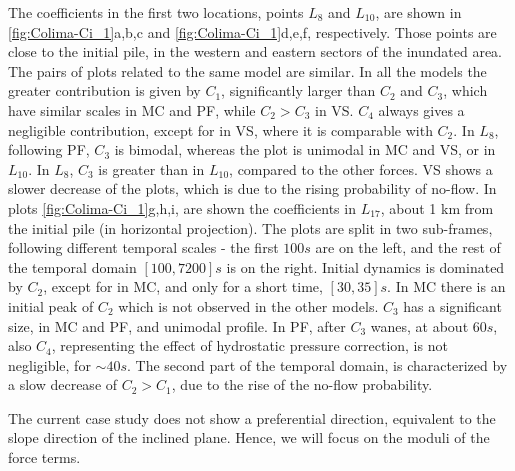 \documentclass{article}
\begin{document}
The coefficients in the first two locations, points $L_8$ and $L_{10}$, are shown in \ref{fig:Colima-Ci_1}a,b,c and \ref{fig:Colima-Ci_1}d,e,f, respectively. Those points are close to the initial pile, in the western and eastern sectors of the inundated area. The pairs of plots related to the same model are similar. In all the models the greater contribution is given by $C_1$, significantly larger than $C_2$ and $C_3$, which have similar scales in MC and PF, while $C_2>C_3$ in VS. $C_4$ always gives a negligible contribution, except for in VS, where it is comparable with $C_2$. In $L_8$, following PF, $C_3$ is bimodal, whereas the plot is unimodal in MC and VS, or in $L_{10}$. In $L_8$, $C_3$ is greater than in $L_{10}$, compared to the other forces. VS shows a slower decrease of the plots, which is due to the rising probability of no-flow. In plots \ref{fig:Colima-Ci_1}g,h,i, are shown the coefficients in $L_{17}$, about 1 km from the initial pile (in horizontal projection). The plots are split in two sub-frames, following different temporal scales - the first $100 s$ are on the left, and the rest of the temporal domain $[100, 7200] s$ is on the right. Initial dynamics is dominated by $C_2$, except for in MC, and only for a short time, $[30, 35] s$. In MC there is an initial peak of $C_2$ which is not observed in the other models.  $C_3$ has a significant size, in MC and PF, and unimodal profile. In PF, after $C_3$ wanes, at about $60 s$, also $C_4$, representing the effect of hydrostatic pressure correction, is not negligible, for $\sim 40 s$. The second part of the temporal domain, is characterized by a slow decrease of $C_2>C_1$, due to the rise of the no-flow probability.

The current case study does not show a preferential direction, equivalent to the slope direction of the inclined plane. Hence, we will focus on the moduli of the force terms.
\end{document}
